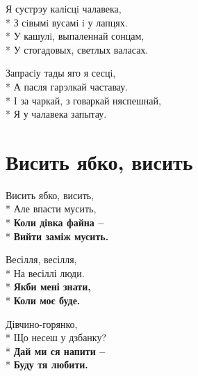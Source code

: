 \medskip

\begin{minipage}{\linewidth}
Я сустрэу калiсцi чалавека,\\*
З сiвымi вусамi i у лапцях.\\*
У кашулi, выпаленнай сонцам,\\*
У стогадовых, светлых валасах.\\
\end{minipage}\par\medskip\nobreak

\medskip

\begin{minipage}{\linewidth}
Запрасiу тады яго я сесцi,\\*
А пасля гарэлкай частавау.\\*
I за чаркай, з говаркай няспешнай,\\*
Я у чалавека запытау.\\
\end{minipage}

\vspace{\fill}\newpage

\section{Висить ябко, висить}
\label{song:Висить_ябко,_висить}

\medskip

\begin{minipage}{\linewidth}
Висить ябко, висить,\\*
Але впасти мусить,\\*
\textbf{Коли дівка файна –}\\*
\textbf{Вийти заміж мусить.}\\
\end{minipage}\par\medskip\nobreak

\medskip

\begin{minipage}{\linewidth}
Весілля, весілля,\\*
На весіллі люди.\\*
\textbf{Якби мені знати,}\\*
\textbf{Коли моє буде.}\\
\end{minipage}\par\medskip\nobreak

\medskip

\begin{minipage}{\linewidth}
Дівчино-горянко,\\*
Що несеш у дзбанку?\\*
\textbf{Дай ми ся напити –}\\*
\textbf{Буду тя любити.}\\
\end{minipage}\par\medskip\nobreak

